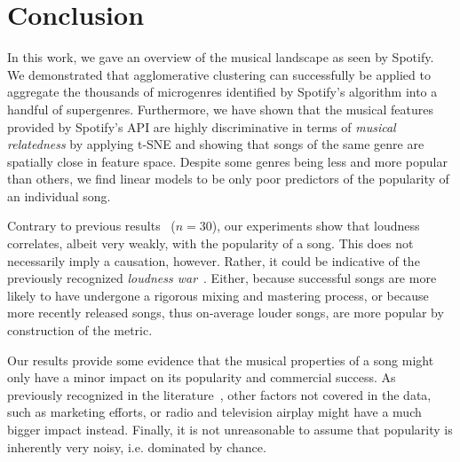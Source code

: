 \documentclass{article}
\begin{document}
\section{Conclusion}

In this work, we gave an overview of the musical landscape as seen by Spotify.
We demonstrated that agglomerative clustering can successfully be applied to aggregate the thousands of microgenres identified by Spotify's algorithm into a handful of supergenres. 
Furthermore, we have shown that the musical features provided by Spotify's API are highly discriminative in terms of \emph{musical relatedness} by applying t-SNE and showing that songs of the same genre are spatially close in  feature space. Despite some genres being less and more popular than others, we find linear models to be only poor predictors of the popularity of an individual song.

Contrary to previous results~\cite{viney2008obsession} ($n=30$), our experiments show that loudness correlates, albeit very weakly, with the popularity of a song. This does not necessarily imply a causation, however. Rather, it could be indicative of the previously recognized \emph{loudness war}~\cite{vickers2010loudness}. Either, because successful songs are more likely to have undergone a rigorous mixing and mastering process, or because more recently released songs, thus on-average louder songs, are more popular by construction of the metric.

Our results provide some evidence that the musical properties of a song might only have a minor impact on its popularity and commercial success. As previously recognized in the literature~\cite{viney2008obsession}, other factors not covered in the data, such as marketing efforts, or radio and television airplay might have a much bigger impact instead. Finally, it is not unreasonable to assume that popularity is inherently very noisy, i.e. dominated by chance.  







\end{document}
